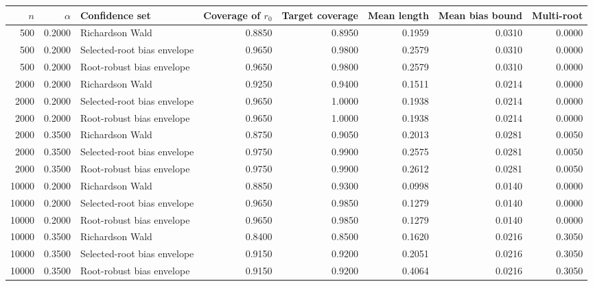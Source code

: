 \begin{tabular}{rrlrrrrr}
\toprule
$n$ & $\alpha$ & Confidence set & Coverage of $r_0$ & Target coverage & Mean length & Mean bias bound & Multi-root \\
\midrule
500 & 0.2000 & Richardson Wald & 0.8850 & 0.8950 & 0.1959 & 0.0310 & 0.0000 \\
500 & 0.2000 & Selected-root bias envelope & 0.9650 & 0.9800 & 0.2579 & 0.0310 & 0.0000 \\
500 & 0.2000 & Root-robust bias envelope & 0.9650 & 0.9800 & 0.2579 & 0.0310 & 0.0000 \\
2000 & 0.2000 & Richardson Wald & 0.9250 & 0.9400 & 0.1511 & 0.0214 & 0.0000 \\
2000 & 0.2000 & Selected-root bias envelope & 0.9650 & 1.0000 & 0.1938 & 0.0214 & 0.0000 \\
2000 & 0.2000 & Root-robust bias envelope & 0.9650 & 1.0000 & 0.1938 & 0.0214 & 0.0000 \\
2000 & 0.3500 & Richardson Wald & 0.8750 & 0.9050 & 0.2013 & 0.0281 & 0.0050 \\
2000 & 0.3500 & Selected-root bias envelope & 0.9750 & 0.9900 & 0.2575 & 0.0281 & 0.0050 \\
2000 & 0.3500 & Root-robust bias envelope & 0.9750 & 0.9900 & 0.2612 & 0.0281 & 0.0050 \\
10000 & 0.2000 & Richardson Wald & 0.8850 & 0.9300 & 0.0998 & 0.0140 & 0.0000 \\
10000 & 0.2000 & Selected-root bias envelope & 0.9650 & 0.9850 & 0.1279 & 0.0140 & 0.0000 \\
10000 & 0.2000 & Root-robust bias envelope & 0.9650 & 0.9850 & 0.1279 & 0.0140 & 0.0000 \\
10000 & 0.3500 & Richardson Wald & 0.8400 & 0.8500 & 0.1620 & 0.0216 & 0.3050 \\
10000 & 0.3500 & Selected-root bias envelope & 0.9150 & 0.9200 & 0.2051 & 0.0216 & 0.3050 \\
10000 & 0.3500 & Root-robust bias envelope & 0.9150 & 0.9200 & 0.4064 & 0.0216 & 0.3050 \\
\bottomrule
\end{tabular}
